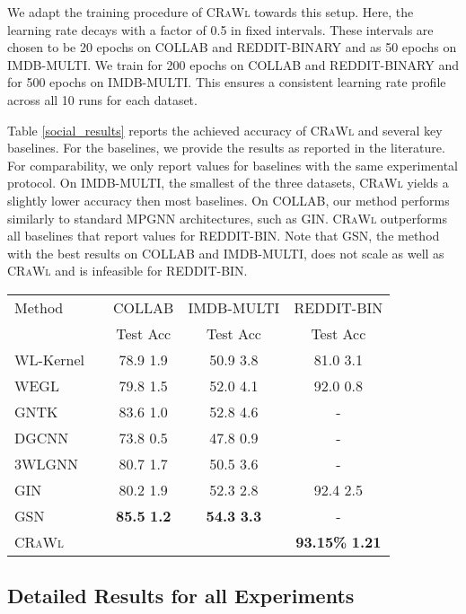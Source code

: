 \documentclass{scrartcl} \usepackage[dvipsnames]{xcolor}
\newcommand{\crawl}{\textsc{CRaWl}}
\begin{document}
We adapt the training procedure of \crawl{} towards this setup.
Here, the learning rate decays with a factor of 0.5 in fixed intervals.
These intervals are chosen to be 20 epochs on COLLAB and REDDIT-BINARY and as 50 epochs on IMDB-MULTI.
We train for 200 epochs on COLLAB and REDDIT-BINARY and for 500 epochs on IMDB-MULTI.
This ensures a consistent learning rate profile across all 10 runs for each dataset.

Table \ref{social_results} reports the achieved accuracy of \crawl{} and several key baselines.
For the baselines, we provide the results as reported in the literature.
For comparability, we only report values for baselines with the same experimental protocol.
On IMDB-MULTI, the smallest of the three datasets, \crawl{} yields a slightly lower accuracy then most baselines.
On COLLAB, our method performs similarly to standard MPGNN architectures, such as GIN.
\crawl{} outperforms all baselines that report values for REDDIT-BIN.
Note that GSN, the method with the best results on COLLAB and IMDB-MULTI, does not scale as well as \crawl{} and is infeasible for REDDIT-BIN.


\begin{table*}[t]
\caption{Accuracy on Social Datasets.}
\label{social_results}
\begin{center}
\begin{small}
\begin{tabular}{l r|c|c|c}
\toprule
Method      && COLLAB & IMDB-MULTI & REDDIT-BIN \\
            && Test Acc & Test Acc & Test Acc \\
\midrule
WL-Kernel   &\citep{shervashidze2011weisfeiler}& 78.9  1.9 & 50.9  3.8 & 81.0  3.1 \\
WEGL        &\citep{kolouri2020wasserstein}& 79.8  1.5 & 52.0  4.1 & 92.0  0.8 \\
GNTK        &\citep{NEURIPS2019_663fd3c5}& 83.6  1.0 & 52.8  4.6 & - \\
DGCNN       &\citep{zhang2018end}& 73.8  0.5 & 47.8  0.9 & - \\
3WLGNN      &\citep{maron2019provably}& 80.7  1.7 & 50.5  3.6 & - \\
GIN         &\citep{Keyulu18}& 80.2  1.9 & 52.3  2.8 & 92.4  2.5 \\
GSN         &\citep{bouritsas2020improving}& \textbf{85.5}  \textbf{1.2} & \textbf{54.3}  \textbf{3.3} & - \\

\midrule
\crawl{}    &&   &  & \textbf{93.15\%}  \textbf{1.21} \\
\bottomrule
\end{tabular}
\end{small}
\end{center}
\vskip -0.1in
\end{table*} \subsection{Detailed Results for all Experiments}
\end{document}

